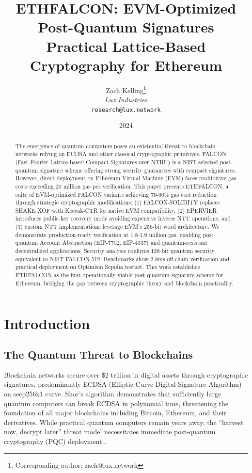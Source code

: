 \documentclass[11pt,a4paper]{article}
\title{\textbf{ETHFALCON: EVM-Optimized Post-Quantum Signatures}\\
\large{Practical Lattice-Based Cryptography for Ethereum}}
\author{
Zach Kelling\thanks{Corresponding author: zach@lux.network}\\
\textit{Lux Industries}\\
\texttt{research@lux.network}
}
\date{2024}
\begin{document}
\luxcoverpage
\maketitle

\begin{abstract}
The emergence of quantum computers poses an existential threat to blockchain networks relying on ECDSA and other classical cryptographic primitives. FALCON (Fast-Fourier Lattice-based Compact Signatures over NTRU) is a NIST-selected post-quantum signature scheme offering strong security guarantees with compact signatures. However, direct deployment on Ethereum Virtual Machine (EVM) faces prohibitive gas costs exceeding 20 million gas per verification. This paper presents ETHFALCON, a suite of EVM-optimized FALCON variants achieving 70-90\% gas cost reduction through strategic cryptographic modifications: (1) FALCON-SOLIDITY replaces SHAKE XOF with Keccak-CTR for native EVM compatibility, (2) EPERVIER introduces public key recovery mode avoiding expensive inverse NTT operations, and (3) custom NTT implementations leverage EVM's 256-bit word architecture. We demonstrate production-ready verification at 1.8-1.9 million gas, enabling post-quantum Account Abstraction (EIP-7702, EIP-4337) and quantum-resistant decentralized applications. Security analysis confirms 128-bit quantum security equivalent to NIST FALCON-512. Benchmarks show 2.8ms off-chain verification and practical deployment on Optimism Sepolia testnet. This work establishes ETHFALCON as the first operationally viable post-quantum signature scheme for Ethereum, bridging the gap between cryptographic theory and blockchain practicality.
\end{abstract}

\section{Introduction}

\subsection{The Quantum Threat to Blockchains}

Blockchain networks secure over \$2 trillion in digital assets through cryptographic signatures, predominantly ECDSA (Elliptic Curve Digital Signature Algorithm) on secp256k1 curve. Shor's algorithm \cite{shor1997polynomial} demonstrates that sufficiently large quantum computers can break ECDSA in polynomial time, threatening the foundation of all major blockchains including Bitcoin, Ethereum, and their derivatives. While practical quantum computers remain years away, the ``harvest now, decrypt later'' threat model necessitates immediate post-quantum cryptography (PQC) deployment \cite{mosca2018cybersecurity}.
\end{document}

